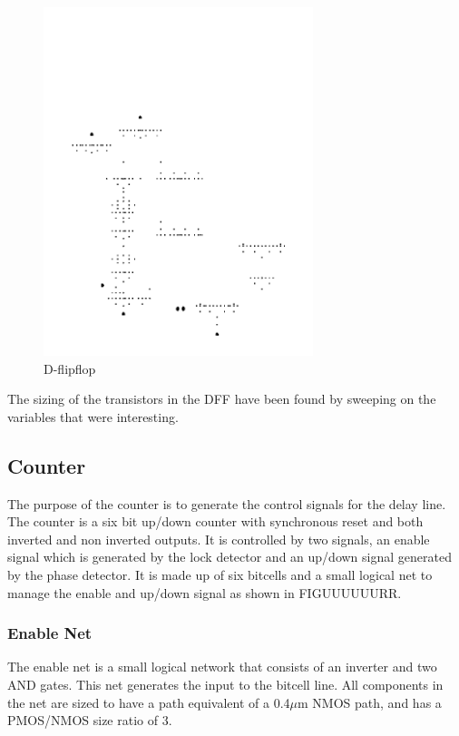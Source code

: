 \documentclass[a4paper,12pt]{article} \usepackage{graphicx}
\begin{document}
\begin{figure}
\centering
\includegraphics[width=0.7\textwidth, angle = 270]{../Bilder/DFF-1.png}
\caption{D-flipflop}
\label{fig:DFF}
\end{figure}

The sizing of the transistors in the DFF have been found by sweeping on the variables that were interesting.

\subsection{Counter}
The purpose of the counter is to generate the control signals for the delay line.
The counter is a six bit up/down counter with synchronous reset and both
inverted and non inverted outputs. It is controlled by two signals, an enable
signal which is generated by the lock detector and an up/down signal generated
by the phase detector. It is made up of six bitcells and a small logical net to
manage the enable and up/down signal as shown in FIGUUUUUURR.
\subsubsection{Enable Net}
The enable net is a small logical network that consists of an inverter and two
AND gates. This net generates the input to the bitcell line.
All components in the net are sized to have a path equivalent of a 0.4$\mu$m NMOS
path, and has a PMOS/NMOS size ratio of 3.
\end{document}
